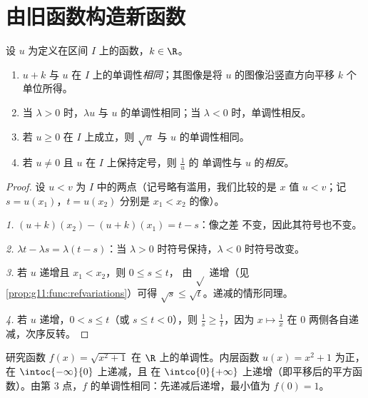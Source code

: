 \section{由旧函数构造新函数}

\begin{proposition}[变换]\label{prop:g11:func:transforms}
设 $u$ 为定义在区间 $I$ 上的函数，$k \in \R$。
\begin{enumerate}
  \item $u + k$ 与 $u$ 在 $I$ 上的单调性\emph{相同}；其图像是将
        $u$ 的图像沿竖直方向平移 $k$ 个单位所得。
  \item 当 $\lambda > 0$ 时，$\lambda u$ 与 $u$ 的单调性相同；当
        $\lambda < 0$ 时，单调性相反。
  \item 若 $u \geq 0$ 在 $I$ 上成立，则 $\sqrt u$ 与
        $u$ 的单调性相同。
  \item 若 $u \neq 0$ 且 $u$ 在 $I$ 上保持定号，则 $\frac1u$ 的
        单调性与 $u$ 的\emph{相反}。
\end{enumerate}
\end{proposition}

\begin{proof}
设 $u < v$ 为 $I$ 中的两点（记号略有滥用，我们比较的是 $x$ 值 $u < v$；记
$s = u(x_1)$，$t = u(x_2)$ 分别是 $x_1 < x_2$ 的像）。

\emph{1.} $(u+k)(x_2) - (u+k)(x_1) = t - s$：像之差
不变，因此其符号也不变。

\emph{2.} $\lambda t - \lambda s = \lambda(t - s)$：当
$\lambda > 0$ 时符号保持，$\lambda < 0$ 时符号改变。

\emph{3.} 若 $u$ 递增且 $x_1 < x_2$，则 $0 \leq s \leq t$，
由 $\sqrt{}$ 递增（见\cref{prop:g11:func:refvariations}）可得
$\sqrt s \leq \sqrt t$。递减的情形同理。

\emph{4.} 若 $u$ 递增，$0 < s \leq t$（或 $s \leq t < 0$），则
$\frac1s \geq \frac1t$，因为 $x \mapsto \frac1x$ 在
$0$ 两侧各自递减，次序反转。
\end{proof}

\begin{example}\label{ex:g11:func:composite}
研究函数 $f(x) = \sqrt{x^2 + 1}$ 在 $\R$ 上的单调性。内层函数
$u(x) = x^2 + 1$ 为正，在 $\intoc{-\infty}{0}$ 上递减，且
在 $\intco{0}{+\infty}$ 上递增（即平移后的平方函数）。由第 3 点，$f$
的单调性相同：先递减后递增，最小值为
$f(0) = 1$。
\end{example}

